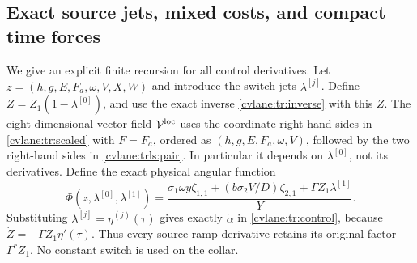 \subsection{Exact source jets, mixed costs, and compact time forces}

We give an explicit finite recursion for all control derivatives.
Let $z=(h,g,E,F_a,\omega,V,X,W)$ and introduce the switch jets
$\lambda^{[j]}$. Define $Z=Z_1(1-\lambda^{[0]})$,
and use the exact inverse \eqref{cvlane:tr:inverse} with this $Z$.
The eight-dimensional vector field $\mathcal V^{\rm loc}$
uses the coordinate right-hand sides in \eqref{cvlane:tr:scaled}
with $F=F_a$, ordered as $(h,g,E,F_a,\omega,V)$,
followed by the two right-hand sides in \eqref{cvlane:trls:pair}.
In particular it depends
on $\lambda^{[0]}$, not its derivatives. Define the exact
physical angular function
\begin{equation}\label{cvlane:trls:controlfunction}
 \Phi(z,\lambda^{[0]},\lambda^{[1]})
  =\frac{\sigma_1\omega y\zeta_{1,1}
           +(b\sigma_2V/D)\zeta_{2,1}
           +\Gamma Z_1\lambda^{[1]}}{Y}.
\end{equation}
Substituting $\lambda^{[j]}=\eta^{(j)}(\tau)$ gives
exactly $\dot\alpha$ in \eqref{cvlane:tr:control}, because
$\dot Z=-\Gamma Z_1\eta'(\tau)$.
Thus every source-ramp derivative retains its original factor
$\Gamma^rZ_1$. No constant switch is used on the collar.

